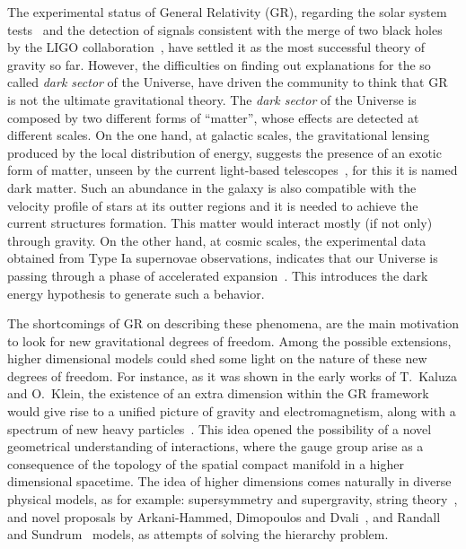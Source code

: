 \documentclass[aps,prd,12pt,superscriptaddress,showpacs,showkeys,longbibliography,reprint,nofootinbib]{revtex4-1}
\begin{document}
The experimental status of General Relativity (GR), regarding the solar system tests~\cite{Will:2014kxa} and the detection of signals consistent with the merge of two black holes by the LIGO collaboration~\cite{Abbott:2016blz,Abbott:2016nmj}, have settled it as the most successful theory of gravity so far. However, the difficulties on finding out explanations for the so called \emph{dark sector} of the Universe,
have driven the community to think that GR is not the ultimate gravitational theory. 
The \emph{dark sector} of the Universe is composed by two different forms of ``matter'', whose effects are detected at different scales. On the one hand, at galactic scales, the gravitational lensing produced by the local distribution of energy, suggests the presence of an exotic form of matter, unseen by the current light-based telescopes~\cite{Sofue:2000jx}, for this it is named dark matter. Such an abundance in the galaxy is also compatible with the velocity profile of stars at its outter regions and it is needed to achieve the current structures formation. This matter would interact mostly (if not only) through gravity. On the other hand, at cosmic scales, the experimental data obtained from Type Ia supernovae observations, indicates that our Universe is passing through a phase of accelerated expansion~\cite{Riess:1998cb}. This introduces the dark energy hypothesis to generate such a behavior. 

The shortcomings of GR on describing these phenomena, are the main motivation to look for new gravitational degrees of freedom. Among the possible extensions, higher dimensional models could shed some light on the nature of these new degrees of freedom. For instance, as it was shown in the early works of T.~Kaluza and O.~Klein, the existence of an extra dimension within the GR framework would give rise to a unified picture of gravity and electromagnetism, along with a spectrum of new heavy particles~\cite{Kaluza:1921tu,*Klein:1926tv}. This idea opened the possibility of a novel geometrical understanding of interactions, where the gauge group arise as a consequence of the topology of the spatial compact manifold in a higher dimensional spacetime. The idea of higher dimensions comes naturally in diverse physical models, as for example: supersymmetry and supergravity, string theory~\cite{Green:1987sp,*Green:1987mn}, and novel proposals by Arkani-Hammed, Dimopoulos and Dvali~\cite{ArkaniHamed:1998rs,*Antoniadis:1998ig}, and Randall and Sundrum~\cite{Randall:1999ee,*Randall:1999vf} models, as attempts of solving the hierarchy problem.
\end{document}
